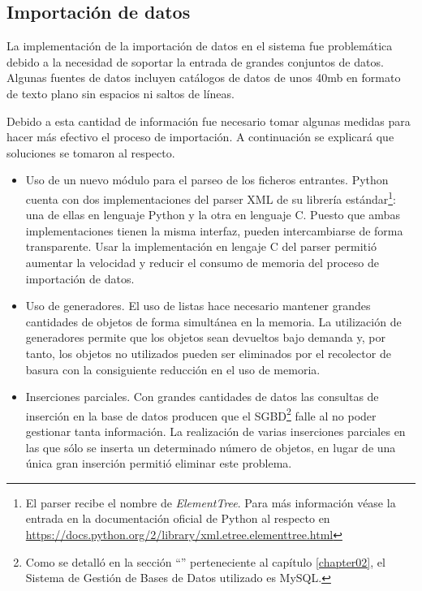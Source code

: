 	\subsection{Importación de datos}
	\label{implementacion:importacion de datos}
		
		La implementación de la importación de datos en el sistema fue problemática debido a la necesidad de soportar la entrada de grandes conjuntos de datos.  Algunas fuentes de datos incluyen catálogos de datos de unos 40mb en formato de texto plano sin espacios ni saltos de líneas.
		
		Debido a esta cantidad de información fue necesario tomar algunas medidas para hacer más efectivo el proceso de importación.  A continuación se explicará que soluciones se tomaron al respecto.
		\begin{itemize}
			\item
				Uso de un nuevo módulo para el parseo de los ficheros entrantes.  Python cuenta con dos implementaciones del parser XML de su librería estándar\footnote{El parser recibe el nombre de \textit{ElementTree}.  Para más información véase la entrada en la documentación oficial de Python al respecto en \url{https://docs.python.org/2/library/xml.etree.elementtree.html}}: una de ellas en lenguaje Python y la otra en lenguaje C.  Puesto que ambas implementaciones tienen la misma interfaz, pueden intercambiarse de forma transparente.  Usar la implementación en lengaje C del parser permitió aumentar la velocidad y reducir el consumo de memoria del proceso de importación de datos.
			\item
				Uso de generadores.  El uso de listas hace necesario mantener grandes cantidades de objetos de forma simultánea en la memoria.  La utilización de generadores permite que los objetos sean devueltos bajo demanda y, por tanto, los objetos no utilizados pueden ser eliminados por el recolector de basura con la consiguiente reducción en el uso de memoria.
			\item
				Inserciones parciales.  Con grandes cantidades de datos las consultas de inserción en la base de datos producen que el SGBD\footnote{Como se detalló en la sección ``'' perteneciente al capítulo \ref{chapter02}, el Sistema de Gestión de Bases de Datos utilizado es MySQL.} falle al no poder gestionar tanta información.  La realización de varias inserciones parciales en las que sólo se inserta un determinado número de objetos, en lugar de una única gran inserción permitió eliminar este problema.
		\end{itemize}
		
